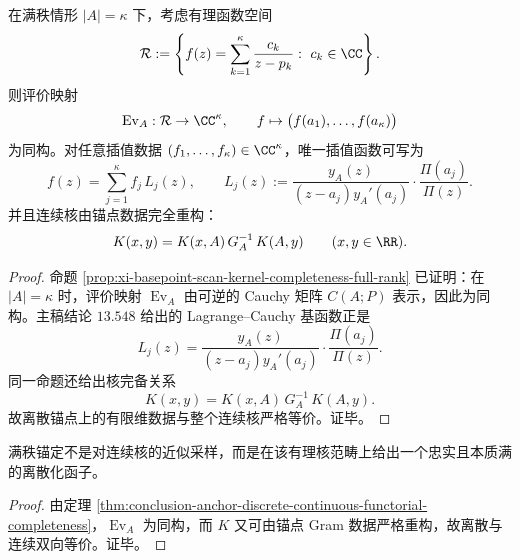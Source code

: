 \begin{theorem}[离散锚点与连续核的函子完备性]\label{thm:conclusion-anchor-discrete-continuous-functorial-completeness}
在满秩情形 \(|A|=\kappa\) 下，考虑有理函数空间
\[
\mathcal R:=
\left\{
f(z)=\sum_{k=1}^{\kappa}\frac{c_k}{z-p_k}:\ c_k\in\CC
\right\}.
\]
则评价映射
\[
\operatorname{Ev}_A:\mathcal R\to \CC^\kappa,
\qquad
f\mapsto \bigl(f(a_1),\dots,f(a_\kappa)\bigr)
\]
为同构。对任意插值数据 \((f_1,\dots,f_\kappa)\in\CC^\kappa\)，唯一插值函数可写为
\[
f(z)=\sum_{j=1}^{\kappa}f_j\,L_j(z),
\qquad
L_j(z):=
\frac{y_A(z)}{(z-a_j)y_A'(a_j)}\cdot \frac{\Pi(a_j)}{\Pi(z)}.
\]
并且连续核由锚点数据完全重构：
\[
K(x,y)=K(x,A)\,G_A^{-1}\,K(A,y)
\qquad (x,y\in\RR).
\]
\end{theorem}
\begin{proof}
命题 \ref{prop:xi-basepoint-scan-kernel-completeness-full-rank} 已证明：在 \(|A|=\kappa\) 时，评价映射 \(\operatorname{Ev}_A\) 由可逆的 Cauchy 矩阵 \(C(A;P)\) 表示，因此为同构。主稿结论 \(13.548\) 给出的 Lagrange--Cauchy 基函数正是
\[
L_j(z)=
\frac{y_A(z)}{(z-a_j)y_A'(a_j)}\cdot \frac{\Pi(a_j)}{\Pi(z)}.
\]
同一命题还给出核完备关系
\[
K(x,y)=K(x,A)\,G_A^{-1}\,K(A,y).
\]
故离散锚点上的有限维数据与整个连续核严格等价。证毕。
\end{proof}

\begin{corollary}[满秩离散化的严格双向等价]\label{cor:conclusion-anchor-discreteization-bidirectional-equivalence}
满秩锚定不是对连续核的近似采样，而是在该有理核范畴上给出一个忠实且本质满的离散化函子。
\end{corollary}
\begin{proof}
由定理 \ref{thm:conclusion-anchor-discrete-continuous-functorial-completeness}，\(\operatorname{Ev}_A\) 为同构，而 \(K\) 又可由锚点 Gram 数据严格重构，故离散与连续双向等价。证毕。
\end{proof}


